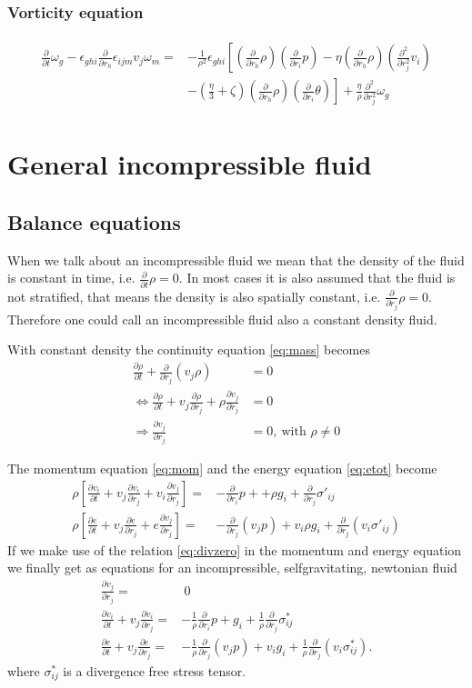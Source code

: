 \documentclass[a4paper,
					12pt,
					twoside,
					openright
					]{book}
\newcommand{\lra}[1]{{ \left( #1 \right) }}
\newcommand{\lrb}[1]{{ \left[ #1 \right] }}
\newcommand{\pd}[1]{\frac{\partial}{\partial #1}}
\newcommand{\ppd}[2]{\frac{\partial #2}{\partial #1}}
\newcommand{\pdd}[1]{\frac{\partial^2}{\partial #1^2}}
\begin{document}
\subsection*{Vorticity equation}
\begin{align}
\begin{split}
\pd{t}\omega_g
-\epsilon_{ghi}\pd{r_h} \epsilon_{ijm} v_j \omega_m =
&-\frac{1}{\rho^2}\epsilon_{ghi}\left[
\lra{\pd{r_h}\rho} \lra{\pd{r_i}p}
-\eta \lra{\pd{r_h}\rho} \lra{\pdd{r_j}v_i}\right.\\
&\left.-\lra{\frac{\eta}{3}+\zeta} \lra{\pd{r_h}\rho} 
\lra{\pd{r_i}\theta} \right]
+\frac{\eta}{\rho}\pdd{r_j}\omega_g
\end{split}
\end{align}

\chapter{General incompressible fluid}
\section{Balance equations}
When we talk about an incompressible fluid we mean that the density of the fluid
is constant in time, i.e. $\pd{t}\rho=0$. In most cases it is also assumed that 
the fluid is not stratified, that means the density is also spatially constant,
i.e. $\pd{r_j}\rho=0$. Therefore one could call an incompressible fluid also a
constant density fluid.

With constant density the continuity equation \eqref{eq:mass} becomes
\begin{align}
\ppd{t}{\rho} + \pd{r_j}(v_j \rho) &= 0 \\
\Leftrightarrow \ppd{t}{\rho}+ v_j \ppd{r_j}{\rho} + \rho \ppd{r_j}{v_j} &= 0\\
\Rightarrow \ppd{r_j}{v_j} &= 0,\ \text{with $\rho\neq 0$} \label{eq:divzero}
\end{align}

The momentum equation \eqref{eq:mom} and the energy equation
\eqref{eq:etot} 
become
\begin{align}
\rho \lrb{\ppd{t}{v_i} + v_j \ppd{r_j}{v_i} + v_i \ppd{r_j}{v_j}}  
=& -\pd{r_i}p + +\rho g_i+ \pd{r_j}\sigma'_{ij} \\
\rho \lrb{\ppd{t}{e} + v_j \ppd{r_j}{e} + e \ppd{r_j}{v_j}} 
=& -\pd{r_j}(v_j p) + v_i \rho g_i +\pd{r_j}(v_i \sigma'_{ij})
\end{align}
If we make use of the relation \eqref{eq:divzero} in the momentum and energy 
equation we finally get as equations for an incompressible, selfgravitating, 
newtonian fluid
\begin{align}
\ppd{r_j}{v_j} =&\ 0\\
\ppd{t}{v_i} + v_j \ppd{r_j}{v_i} =& -\frac{1}{\rho}\pd{r_i}p + g_i
+\frac{1}{\rho}\pd{r_j}\sigma^*_{ij}\\
\ppd{t}{e} + v_j \ppd{r_j}{e} =& -\frac{1}{\rho} \pd{r_j}(v_j p) + v_i g_i
+\frac{1}{\rho}\pd{r_j}(v_i \sigma^*_{ij}).
\end{align}
where $\sigma^*_{ij}$ is a divergence free stress tensor.
\end{document}
